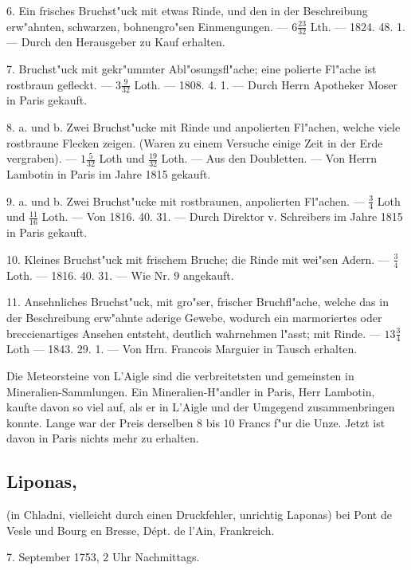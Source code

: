 \documentclass[a4paper, 11pt, oneside, polutonikogreek, german]{article}
\begin{document}
6. Ein frisches Bruchst"uck mit etwas Rinde, und den in der Beschreibung erw"ahnten, schwarzen, bohnengro"sen Einmengungen. --- $6\frac{23}{32}$ Lth. --- 1824. 48. 1. --- Durch den Herausgeber zu Kauf erhalten.

7. Bruchst"uck mit gekr"ummter Abl"osungsfl"ache; eine polierte Fl"ache ist rostbraun gefleckt. --- $3\frac{9}{32}$ Loth. --- 1808. 4. 1. --- Durch Herrn Apotheker Moser in Paris gekauft.

8. a. und b. Zwei Bruchst"ucke mit Rinde und anpolierten Fl"achen, welche viele rostbraune Flecken zeigen. (Waren zu einem Versuche einige Zeit in der Erde vergraben). --- $1\frac{5}{32}$ Loth und $\frac{19}{32}$ Loth. --- Aus den Doubletten. --- Von Herrn Lambotin in Paris im Jahre 1815 gekauft.

9. a. und b. Zwei Bruchst"ucke mit rostbraunen, anpolierten Fl"achen. --- $\frac{3}{4}$ Loth und $\frac{11}{16}$ Loth. --- Von 1816. 40. 31. --- Durch Direktor v. Schreibers im Jahre 1815 in Paris gekauft.

10. Kleines Bruchst"uck mit frischem Bruche; die Rinde mit wei"sen Adern. --- $\frac{3}{4}$ Loth. --- 1816. 40. 31. --- Wie Nr. 9 angekauft.

11. Ansehnliches Bruchst"uck, mit gro"ser, frischer Bruchfl"ache, welche das in der Beschreibung erw"ahnte aderige Gewebe, wodurch ein marmoriertes oder breccienartiges Ansehen entsteht, deutlich wahrnehmen l"asst; mit Rinde. --- $13\frac{3}{4}$ Loth --- 1843. 29. 1. --- Von Hrn. Francois Marguier in Tausch erhalten.

\setlength{\leftskip}{10mm}
\setlength{\parindent}{0pt}

{\footnotesize Die Meteorsteine von L’Aigle sind die verbreitetsten und gemeinsten in Mineralien-Sammlungen. Ein Mineralien-H"andler in Paris, Herr Lambotin, kaufte davon so viel auf, als er in L’Aigle und der Umgegend zusammenbringen konnte. Lange war der Preis derselben 8 bis 10 Francs f"ur die Unze. Jetzt ist davon in Paris nichts mehr zu erhalten.}

\setlength{\leftskip}{0pt}
\setlength{\parindent}{20pt}

\subsection[Liponas.]{Liponas,}
\begin{center}
\small
(in Chladni, vielleicht durch einen Druckfehler, unrichtig Laponas) bei Pont de Vesle und Bourg en Bresse, Dépt. de l'Ain, Frankreich.

7. September 1753, 2 Uhr Nachmittags.
\end{center}
\end{document}
